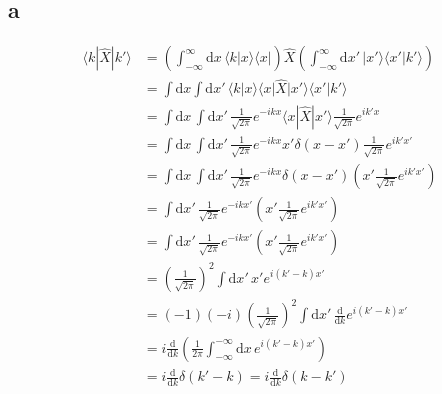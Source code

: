\documentclass[letter]{article}
\begin{document}
\subsection{a} 
\begin{align*}
	\langle k | \hat{X} | k' \rangle &= 
	\left(
		\int_{-\infty}^{\infty} \mathrm{d} x \,  \langle k | x \rangle \langle x | 
	\right) \hat{X} 
	\left(
		\int_{-\infty}^{\infty} \mathrm{d} x' \, 
		| x' \rangle \langle x' | k' \rangle 
	\right)
	\\&= 
\int \mathrm{d} x \int \mathrm{d} x' \, 
\langle k | x \rangle \langle x | \hat{X} | x' \rangle  \langle x' | k' \rangle 
	\\
	&= 
\int \mathrm{d} x \, 
\int \mathrm{d} x ' \, 
\frac{1}{\sqrt{2\pi } } e^{-i k x} \langle x | \hat{X} | x' \rangle \frac{1}{\sqrt{2 \pi }  } e^{i k' x}
	\\
	&= 
\int \mathrm{d} x \, 
\int \mathrm{d} x ' \, 
\frac{1}{\sqrt{2\pi } } e^{-i k x} 
x ' \delta(x - x')
\frac{1}{\sqrt{2 \pi }  } e^{i k' x'}
	\\
	&= 
\int \mathrm{d} x \, 
\int \mathrm{d} x ' \, 
\frac{1}{\sqrt{2\pi } } e^{-i k x} 
 \delta(x - x')
\left( x' \frac{1}{\sqrt{2 \pi }  } e^{i k' x'} \right) 
	\\
	&= 
\int \mathrm{d} x ' \, 
\frac{1}{\sqrt{2\pi } } e^{-i k x'} 
\left( x' \frac{1}{\sqrt{2 \pi }  } e^{i k' x'} \right) 
	\\
	&= 
\int \mathrm{d} x ' \, 
\frac{1}{\sqrt{2\pi } } e^{-i k x'} 
\left( x' \frac{1}{\sqrt{2 \pi }  } e^{i k' x'} \right) 
     \\ &= \left(
	\frac{1}{\sqrt{2 \pi } } \right)^2 
	\int \mathrm{d} x' 
	\, 
	x' e^{i (k' - k )x'}
     \\ &= (-1)(-i) \left(
    \frac{1}{\sqrt{2 \pi } } \right)^2 
	\int \mathrm{d} x' 
\, \frac{\mathrm{d} }{\mathrm{d}  k }
 e^{i (k' - k )x'}
	\\
	&= 
i \frac{\mathrm{d} }{\mathrm{d} k} 
\left(
	\frac{1}{2 \pi } \int_{-\infty}^{-\infty} \mathrm{d} x\, e^{i (k' - k ) x' }
\right)
	\\  &=  
	i \frac{\mathrm{d} }{\mathrm{d} k} \delta(k' - k) = i \frac{\mathrm{d} }{\mathrm{d} k} \delta(k- k')
\end{align*}
\end{document}
